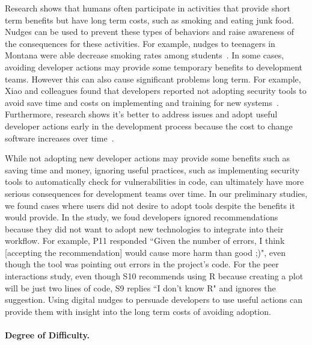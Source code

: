 Research shows that humans often participate in activities that provide short term benefits but have long term costs, such as smoking and eating junk food. Nudges can be used to prevent these types of behaviors and raise awareness of the consequences for these activities. For example, nudges to teenagers in Montana were able decrease smoking rates among students~\cite{linkenbach2003most}. In some cases, avoiding developer actions may provide some temporary benefits to development teams. However this can also cause significant problems long term. For example, Xiao and colleagues found that developers reported not adopting security tools to avoid save time and costs on implementing and training for new systems~\cite{Xiao2014Security}. Furthermore, research shows it's better to address issues and adopt useful developer actions early in the development process because the cost to change software increases over time~\cite{SEEconomics}. 

While not adopting new developer actions may provide some benefits such as saving time and money, ignoring useful practices, such as implementing security tools to automatically check for vulnerabilities in code, can ultimately have more serious consequences for development teams over time.  In our preliminary studies, we found cases where users did not desire to adopt tools despite the benefits it would provide. In the \sorry study, we foud developers ignored recommendations because they did not want to adopt new technologies to integrate into their workflow. For example, P11 responded ``Given the number of errors, I think [accepting the recommendation] would cause more harm than good ;)", even though the tool was pointing out errors in the project's code. For the peer interactions study, even though S10 recommends using R because creating a plot will be just two lines of code, S9 replies ``I don't know R" and ignores the suggestion. Using digital nudges to persuade developers to use useful actions can provide them with insight into the long term costs of avoiding adoption.

\paragraph{Degree of Difficulty.}

